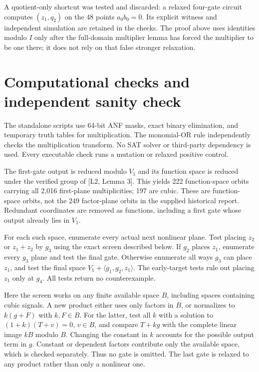 \documentclass[11pt,a4paper]{article}
\begin{document}
A quotient-only shortcut was tested and discarded: a relaxed four-gate circuit computes $(z_1,q_2)$ on the 48 points $a_0b_0=0$. Its explicit witness and independent simulation are retained in the checks. The proof above uses identities modulo $I$ only after the full-domain multiplier lemma has forced the multiplier to be one there; it does not rely on that false stronger relaxation.

\section{Computational checks and independent sanity check}
The standalone scripts use 64-bit ANF masks, exact binary elimination, and temporary truth tables for multiplication. The monomial-OR rule independently checks the multiplication transform. No SAT solver or third-party dependency is used. Every executable check runs a mutation or relaxed positive control.

The first-gate output is reduced modulo $V_1$ and its function space is reduced under the verified group of [L2, Lemma 3]. This yields 222 function-space orbits carrying all 2,016 first-plane multiplicities; 197 are cubic. These are function-space orbits, not the 249 factor-plane orbits in the supplied historical report. Redundant coordinates are removed as functions, including a first gate whose output already lies in $V_1$.

For each such space, enumerate every actual next nonlinear plane. Test placing $z_2$ or $z_1+z_2$ by $g_3$ using the exact screen described below. If $g_2$ places $z_1$, enumerate every $g_3$ plane and test the final gate. Otherwise enumerate all ways $g_3$ can place $z_1$, and test the final space $V_1+\langle g_1,g_2,z_1\rangle$. The early-target tests rule out placing $z_1$ only at $g_4$. All tests return no counterexample.

Here the screen works on any finite available space $B$, including spaces containing cubic signals. A new product either uses only factors in $B$, or normalizes to $k(g+F)$ with $k,F\in B$. For the latter, test all $k$ with a solution to $(1+k)(T+v)=0$, $v\in B$, and compare $T+kg$ with the complete linear image $kB$ modulo $B$. Changing the constant in $k$ accounts for the possible output term in $g$. Constant or dependent factors contribute only the available space, which is checked separately. Thus no gate is omitted. The last gate is relaxed to any product rather than only a nonlinear one.
\end{document}
